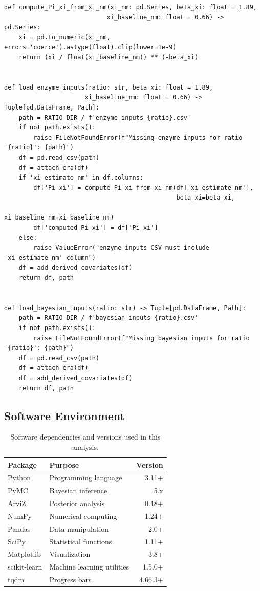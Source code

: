 \documentclass[11pt]{article}
\begin{document}
\begin{lstlisting}[caption={Data Loaders (Complete File)}]
def compute_Pi_xi_from_xi_nm(xi_nm: pd.Series, beta_xi: float = 1.89,
                            xi_baseline_nm: float = 0.66) -> pd.Series:
    xi = pd.to_numeric(xi_nm, errors='coerce').astype(float).clip(lower=1e-9)
    return (xi / float(xi_baseline_nm)) ** (-beta_xi)


def load_enzyme_inputs(ratio: str, beta_xi: float = 1.89,
                      xi_baseline_nm: float = 0.66) -> Tuple[pd.DataFrame, Path]:
    path = RATIO_DIR / f'enzyme_inputs_{ratio}.csv'
    if not path.exists():
        raise FileNotFoundError(f"Missing enzyme inputs for ratio '{ratio}': {path}")
    df = pd.read_csv(path)
    df = attach_era(df)
    if 'xi_estimate_nm' in df.columns:
        df['Pi_xi'] = compute_Pi_xi_from_xi_nm(df['xi_estimate_nm'],
                                               beta_xi=beta_xi,
                                               xi_baseline_nm=xi_baseline_nm)
        df['computed_Pi_xi'] = df['Pi_xi']
    else:
        raise ValueError("enzyme_inputs CSV must include 'xi_estimate_nm' column")
    df = add_derived_covariates(df)
    return df, path


def load_bayesian_inputs(ratio: str) -> Tuple[pd.DataFrame, Path]:
    path = RATIO_DIR / f'bayesian_inputs_{ratio}.csv'
    if not path.exists():
        raise FileNotFoundError(f"Missing bayesian inputs for ratio '{ratio}': {path}")
    df = pd.read_csv(path)
    df = attach_era(df)
    df = add_derived_covariates(df)
    return df, path
\end{lstlisting}

\newpage
\subsection{Software Environment}

\begin{table}[h]
\centering
\caption{Software dependencies and versions used in this analysis.}
\begin{tabular}{llr}
\toprule
\textbf{Package} & \textbf{Purpose} & \textbf{Version} \\
\midrule
Python & Programming language & 3.11+ \\
PyMC & Bayesian inference & 5.x \\
ArviZ & Posterior analysis & 0.18+ \\
NumPy & Numerical computing & 1.24+ \\
Pandas & Data manipulation & 2.0+ \\
SciPy & Statistical functions & 1.11+ \\
Matplotlib & Visualization & 3.8+ \\
scikit-learn & Machine learning utilities & 1.5.0+ \\
tqdm & Progress bars & 4.66.3+ \\
\bottomrule
\end{tabular}
\end{table}
\end{document}

